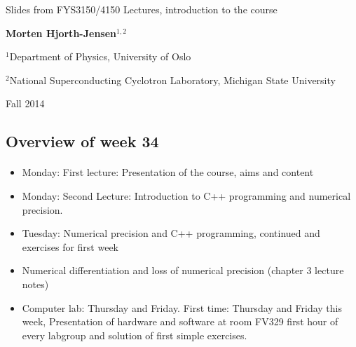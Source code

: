 \documentclass[%
oneside,                 %
final,                   %
10pt]{article}
\begin{document}






\thispagestyle{empty}

\begin{center}
{\LARGE\bf
\begin{spacing}{1.25}
Slides from FYS3150/4150 Lectures, introduction to the course
\end{spacing}
}
\end{center}


\begin{center}
{\bf Morten Hjorth-Jensen${}^{1, 2}$} \\ [0mm]
\end{center}

\begin{center}
\centerline{{\small ${}^1$Department of Physics, University of Oslo}}
\centerline{{\small ${}^2$National Superconducting Cyclotron Laboratory, Michigan State University}}
\end{center}
    

\begin{center}
Fall 2014
\end{center}

\vspace{1cm}


\subsection{Overview of week 34}


\paragraph{}
\begin{itemize}
  \item Monday: First lecture: Presentation of the course, aims and content

  \item Monday: Second Lecture: Introduction to C++ programming and numerical precision.

  \item Tuesday: Numerical precision and C++ programming, continued and exercises for first week

  \item Numerical differentiation and loss of numerical precision (chapter 3 lecture notes)

  \item Computer lab: Thursday and Friday. First time: Thursday and Friday this week, Presentation of hardware and software at room FV329 first hour of every labgroup and solution of first simple exercises.
\end{itemize}
\end{document}
